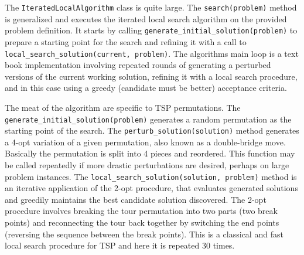 The \texttt{IteratedLocalAlgorithm} class is quite large. The \texttt{search(problem)} method is generalized and executes the iterated local search algorithm on the provided problem definition. It starts by calling \texttt{generate\_initial\_solution(problem)} to prepare a starting point for the search and refining it with a call to \texttt{local\_search\_solution(current, problem)}. The algorithms main loop is a text book implementation involving repeated rounds of generating a perturbed versions of the current working solution, refining it with a local search procedure, and in this case using a greedy (candidate must be better) acceptance criteria.

The meat of the algorithm are specific to TSP permutations. The \texttt{generate\_initial\_solution(problem)} generates a random permutation as the starting point of the search. The \texttt{perturb\_solution(solution)} method generates a 4-opt variation of a given permutation, also known as a double-bridge move. Basically the permutation is split into 4 pieces and reordered. This function may be called repeatedly if more drastic perturbations are desired, perhaps on large problem instances. The \texttt{local\_search\_solution(solution, problem)} method is an iterative application of the 2-opt procedure, that evaluates generated solutions and greedily maintains the best candidate solution discovered. The 2-opt procedure involves breaking the tour permutation into two parts (two break points) and reconnecting the tour back together by switching the end points (reversing the sequence between the break points). This is a classical and fast local search procedure for TSP and here it is repeated 30 times.

